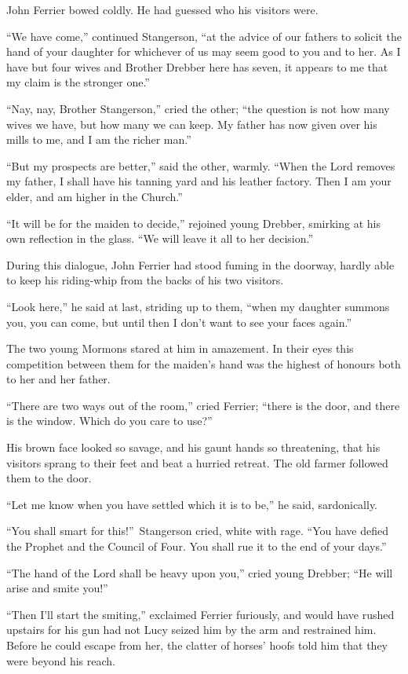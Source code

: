 \documentclass[12pt,english]{book}
\begin{document}
John Ferrier bowed coldly. He had guessed who his visitors were.

{}``We have come,'' continued Stangerson, {}``at the advice of
our fathers to solicit the hand of your daughter for whichever of
us may seem good to you and to her. As I have but four wives and Brother
Drebber here has seven, it appears to me that my claim is the stronger
one.''

{}``Nay, nay, Brother Stangerson,'' cried the other; {}``the question
is not how many wives we have, but how many we can keep. My father
has now given over his mills to me, and I am the richer man.''

{}``But my prospects are better,'' said the other, warmly. {}``When
the Lord removes my father, I shall have his tanning yard and his
leather factory. Then I am your elder, and am higher in the Church.''

{}``It will be for the maiden to decide,'' rejoined young Drebber,
smirking at his own reflection in the glass. {}``We will leave it
all to her decision.''

During this dialogue, John Ferrier had stood fuming in the doorway,
hardly able to keep his riding-whip from the backs of his two visitors.

{}``Look here,'' he said at last, striding up to them, {}``when
my daughter summons you, you can come, but until then I don't want
to see your faces again.''

The two young Mormons stared at him in amazement. In their eyes this
competition between them for the maiden's hand was the highest of
honours both to her and her father.

{}``There are two ways out of the room,'' cried Ferrier; {}``there
is the door, and there is the window. Which do you care to use?''

His brown face looked so savage, and his gaunt hands so threatening,
that his visitors sprang to their feet and beat a hurried retreat.
The old farmer followed them to the door.

{}``Let me know when you have settled which it is to be,'' he said,
sardonically.

{}``You shall smart for this!''\ Stangerson cried, white with rage.
{}``You have defied the Prophet and the Council of Four. You shall
rue it to the end of your days.''

{}``The hand of the Lord shall be heavy upon you,'' cried young
Drebber; {}``He will arise and smite you!''

{}``Then I'll start the smiting,'' exclaimed Ferrier furiously,
and would have rushed upstairs for his gun had not Lucy seized him
by the arm and restrained him. Before he could escape from her, the
clatter of horses' hoofs told him that they were beyond his reach.
\end{document}

